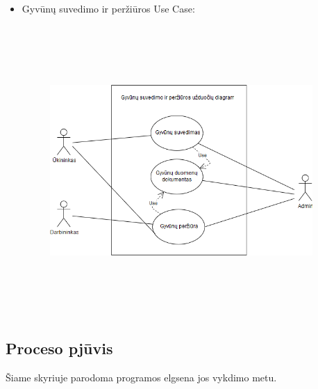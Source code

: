 \documentclass[oneside]{VUMIFPSkursinis}
\begin{document}
\begin{itemize}
\begin {figure}[H]
	\caption{}
	\label{fig:Use_case_zemelapio_zymejimas}
\end{figure}
\item Gyvūnų suvedimo ir peržiūros Use Case:
\begin {figure}[H]
	\centering
		\includegraphics[width=10cm,height=11cm,keepaspectratio]{Use_case_gyvunu_suvedimas.png}
	\caption{}
	\label{fig:Use_case_gyvunu_suvedimas}
\end{figure}
\end{itemize}

\subsection{Proceso pjūvis}
	Šiame skyriuje parodoma programos elgsena jos vykdimo metu.
\end{document}
